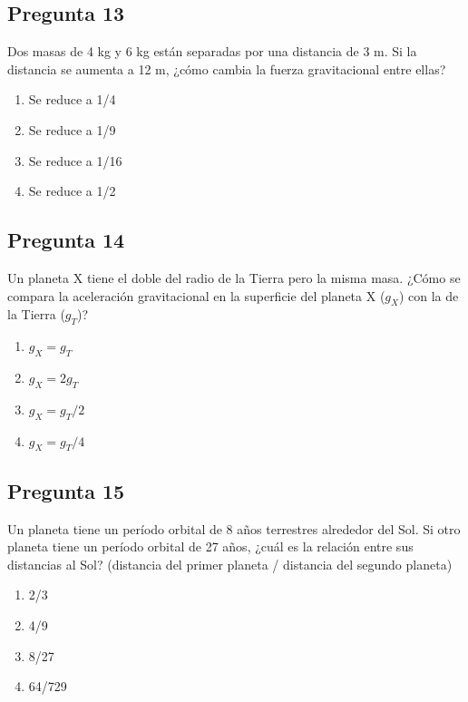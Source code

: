 \begin{preguntabox}
\subsection{Pregunta 13}
Dos masas de 4 kg y 6 kg están separadas por una distancia de 3 m. Si la distancia se aumenta a 12 m, ¿cómo cambia la fuerza gravitacional entre ellas?

\begin{enumerate}
    \item[A)] Se reduce a 1/4
    \item[B)] Se reduce a 1/9
    \item[C)] Se reduce a 1/16
    \item[D)] Se reduce a 1/2
\end{enumerate}
\end{preguntabox}

\begin{preguntabox}
\subsection{Pregunta 14}
Un planeta X tiene el doble del radio de la Tierra pero la misma masa. ¿Cómo se compara la aceleración gravitacional en la superficie del planeta X ($g_X$) con la de la Tierra ($g_T$)?

\begin{enumerate}
    \item[A)] $g_X = g_T$
    \item[B)] $g_X = 2g_T$
    \item[C)] $g_X = g_T/2$
    \item[D)] $g_X = g_T/4$
\end{enumerate}
\end{preguntabox}

\begin{preguntabox}
\subsection{Pregunta 15}
Un planeta tiene un período orbital de 8 años terrestres alrededor del Sol. Si otro planeta tiene un período orbital de 27 años, ¿cuál es la relación entre sus distancias al Sol? (distancia del primer planeta / distancia del segundo planeta)

\begin{enumerate}
    \item[A)] 2/3
    \item[B)] 4/9
    \item[C)] 8/27
    \item[D)] 64/729
\end{enumerate}
\end{preguntabox}

